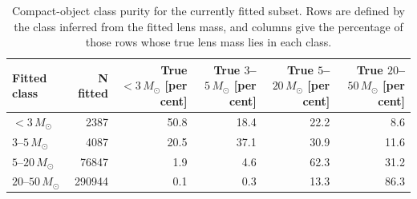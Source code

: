 \begin{table}
\centering
\small
\caption{Compact-object class purity for the currently fitted subset. Rows are defined by the class inferred from the fitted lens mass, and columns give the percentage of those rows whose true lens mass lies in each class.}
\label{tab:compact-object-class-confusion}
\begin{tabular}{lrrrrr}
\hline
Fitted class & N fitted & True $<3\,M_\odot$ [per cent] & True $3$--$5\,M_\odot$ [per cent] & True $5$--$20\,M_\odot$ [per cent] & True $20$--$50\,M_\odot$ [per cent] \\
\hline
$<3\,M_\odot$ & 2387 & 50.8 & 18.4 & 22.2 & 8.6 \\
$3$--$5\,M_\odot$ & 4087 & 20.5 & 37.1 & 30.9 & 11.6 \\
$5$--$20\,M_\odot$ & 76847 & 1.9 & 4.6 & 62.3 & 31.2 \\
$20$--$50\,M_\odot$ & 290944 & 0.1 & 0.3 & 13.3 & 86.3 \\
\hline
\end{tabular}
\end{table}
